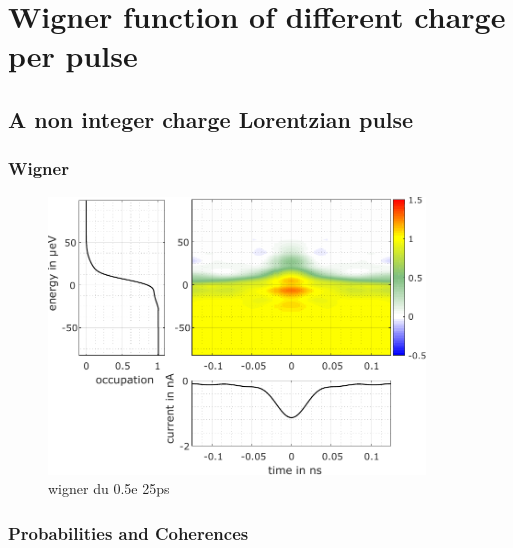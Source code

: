 \chapter{Wigner function of different charge per pulse}


\section{A non integer charge Lorentzian pulse}

\subsection{Wigner}

\begin{figure}[hpbt]
	\centering
	\includegraphics[width = 10cm]{./appD/wigData_leviton_20ps_0_5e_51mK_Projected_Gradient_Method}
	\caption{wigner du 0.5e 25ps}
	\label{fig: wigner du 0.5e 20ps}
\end{figure}

\subsection{Probabilities and Coherences}

